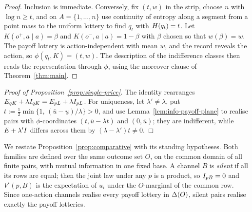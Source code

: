 \begin{proof}
Inclusion is immediate.  Conversely, fix $(t,w)$ in the strip, choose $n$ with $\log n\ge t$, and on
$A=\{1,\dots,n\}$ use continuity of entropy along a segment from a point mass to the uniform lottery to find
$q_t$ with $H(q_t)=t$.  Let $K(o^+,a\mid a)=\beta$ and $K(o^-,a\mid a)=1-\beta$ with $\beta$ chosen so that
$w(\beta)=w$.  The payoff lottery is action-independent with mean $w$, and the record reveals the action, so
$\phi(q_t,K)=(t,w)$.  The description of the indifference classes then reads the representation through $\phi$,
using the moreover clause of Theorem~\ref{thm:main}.
\end{proof}

\begin{proof}[Proof of Proposition~\ref{prop:single-price}]
The identity rearranges $E_{qK}+\lambda I_{qK}=E_{pL}+\lambda I_{pL}$.  For uniqueness, let
$\lambda'\ne\lambda$, put $t:=\tfrac12\min\{1,\,(\overline u-\underline u)/\lambda\}>0$, and use
Lemma~\ref{lem:info-payoff-plane} to realise pairs with $\phi$-coordinates $(t,\overline u-\lambda t)$ and
$(0,\overline u)$; they are indifferent, while $E+\lambda'I$ differs across them by $(\lambda-\lambda')t\ne0$.
\end{proof}

We restate Proposition~\ref{prop:comparative} with its standing hypotheses.  Both families are defined over the
same outcome set $O$, on the common domain of all finite pairs, with mutual information in one fixed base.  A
channel $B$ is \emph{silent} if all its rows are equal; then the joint law under any $p$ is a product, so
$I_{pB}=0$ and $V^i(p,B)$ is the expectation of $u_i$ under the $O$-marginal of the common row.  Since
one-action channels realise every payoff lottery in $\Delta(O)$, silent pairs realise exactly the payoff lotteries.

